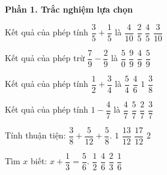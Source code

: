 \textbf{Phần 1. Trắc nghiệm lựa chọn}

\begin{ex} %
Kết quả của phép tính $\dfrac{3}{5} + \dfrac{1}{5}$ là
\choice
{$\dfrac{4}{10}$}
{$\dfrac{2}{5}$}
{\True $\dfrac{4}{5}$}
{$\dfrac{3}{10}$}
\end{ex}

\begin{ex} %
Kết quả của phép trừ $\dfrac{7}{9} - \dfrac{2}{9}$ là
\choice
{$\dfrac{5}{0}$}
{$\dfrac{9}{9}$}
{$\dfrac{4}{9}$}
{\True $\dfrac{5}{9}$}
\end{ex}

\begin{ex} %
Kết quả của phép tính $\dfrac{1}{2} + \dfrac{3}{4}$ là
\choice
{\True $\dfrac{5}{4}$}
{$\dfrac{4}{6}$}
{$1$}
{$\dfrac{3}{8}$}
\end{ex}

\begin{ex} %
Kết quả của phép tính $1 - \dfrac{4}{7}$ là
\choice
{$\dfrac{4}{7}$}
{$\dfrac{5}{7}$}
{$\dfrac{2}{7}$}
{\True $\dfrac{3}{7}$}
\end{ex}

\begin{ex} %
Tính thuận tiện: $\dfrac{3}{8} + \dfrac{5}{12} + \dfrac{5}{8}$.
\choice
{$1$}
{$\dfrac{13}{12}$}
{\True $\dfrac{17}{12}$}
{$2$}
\end{ex}

\begin{ex} %
Tìm $x$ biết: $x + \dfrac{1}{3} = \dfrac{5}{6}$.
\choice
{\True $\dfrac{1}{2}$}
{$\dfrac{4}{6}$}
{$\dfrac{2}{3}$}
{$\dfrac{1}{6}$}
\end{ex}


